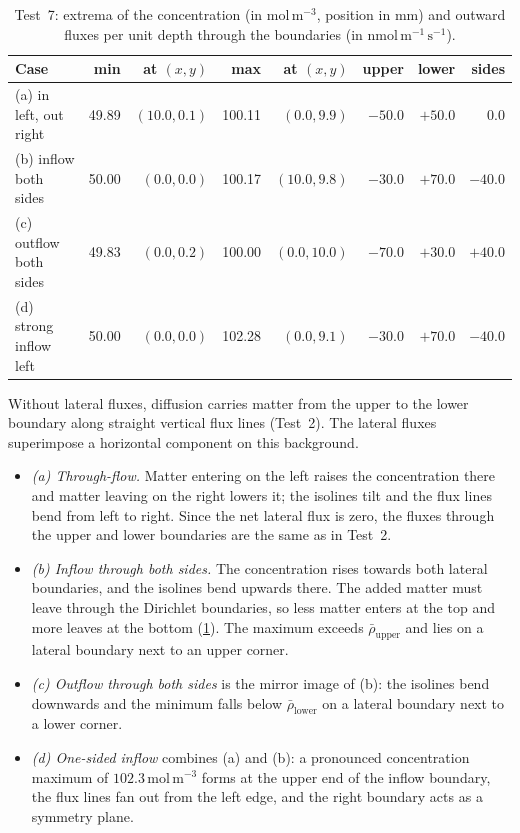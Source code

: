 \documentclass[11pt,a4paper]{article}
\numberwithin{equation}{section}
\theoremstyle{definition}
\theoremstyle{remark}
\newcommand{\rhoUpper}{\bar{\rho}_{\mathrm{upper}}}
\newcommand{\rhoLower}{\bar{\rho}_{\mathrm{lower}}}
\begin{document}
\begin{table}[ht]
  \centering
  \caption{Test~7: extrema of the concentration (in $\mathrm{mol\,m^{-3}}$, position in mm) and
    outward fluxes per unit depth through the boundaries (in $\mathrm{nmol\,m^{-1}\,s^{-1}}$).}
  \label{tab:test7}
  \small
  \begin{tabular}{lrrrrrrr}
    \toprule
    Case & min & at $(x,y)$ & max & at $(x,y)$ & upper & lower & sides \\
    \midrule
    (a) in left, out right     & 49.89 & $(10.0, 0.1)$ & 100.11 & $(0.0, 9.9)$  & $-50.0$ & $+50.0$ & $0.0$ \\
    (b) inflow both sides      & 50.00 & $(0.0, 0.0)$  & 100.17 & $(10.0, 9.8)$ & $-30.0$ & $+70.0$ & $-40.0$ \\
    (c) outflow both sides     & 49.83 & $(0.0, 0.2)$  & 100.00 & $(0.0, 10.0)$ & $-70.0$ & $+30.0$ & $+40.0$ \\
    (d) strong inflow left     & 50.00 & $(0.0, 0.0)$  & 102.28 & $(0.0, 9.1)$  & $-30.0$ & $+70.0$ & $-40.0$ \\
    \bottomrule
  \end{tabular}
\end{table}

Without lateral fluxes, diffusion carries matter from the upper to the lower boundary along straight
vertical flux lines (Test~2). The lateral fluxes superimpose a horizontal component on this
background.
\begin{itemize}\setlength{\itemsep}{2pt}
  \item \emph{(a) Through-flow.} Matter entering on the left raises the concentration there and
    matter leaving on the right lowers it; the isolines tilt and the flux lines bend from left to
    right. Since the net lateral flux is zero, the fluxes through the upper and lower boundaries are
    the same as in Test~2.
  \item \emph{(b) Inflow through both sides.} The concentration rises towards both lateral
    boundaries, and the isolines bend upwards there. The added matter must leave through the Dirichlet
    boundaries, so less matter enters at the top and more leaves at the bottom (\cref{tab:test7}). The
    maximum exceeds $\rhoUpper$ and lies on a lateral boundary next to an upper corner.
  \item \emph{(c) Outflow through both sides} is the mirror image of (b): the isolines bend downwards
    and the minimum falls below $\rhoLower$ on a lateral boundary next to a lower corner.
  \item \emph{(d) One-sided inflow} combines (a) and (b): a pronounced concentration maximum of
    $102.3\,\mathrm{mol\,m^{-3}}$ forms at the upper end of the inflow boundary, the flux lines fan
    out from the left edge, and the right boundary acts as a symmetry plane.
\end{itemize}
\end{document}
